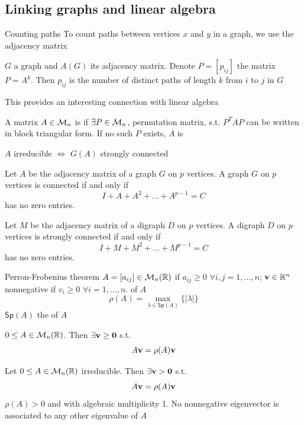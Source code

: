 \documentclass[aspectratio=43]{beamer}
\begin{document}
\subsection{Linking graphs and linear algebra}

\begin{frame}{Counting paths}
	To count paths between vertices $x$ and $y$ in a graph, we use the adjacency matrix
	\vfill
	\begin{theorem}
		$G$ a graph and $A(G)$ its adjacency matrix. Denote $P=[p_{ij}]$ the matrix $P=A^k$. Then $p_{ij}$ is the number of distinct paths of length $k$ from $i$ to $j$ in $G$
	\end{theorem}
	\vfill
	This provides an interesting connection with linear algebra
	\begin{definition}
		A matrix $A\in\mathcal{M}_n$ is  if $\exists P\in\mathcal{M}_n$, permutation matrix, s.t. $P^TAP$ can be written in block triangular form. If no such $P$ exists, $A$ is 
	\end{definition}
	\vfill
	\begin{theorem}
		$A$ irreducible $\iff$ $G(A)$ strongly connected
	\end{theorem}
\end{frame}

\begin{frame}
	\begin{theorem}
		Let $A$ be the adjacency matrix of a graph $G$ on $p$ vertices. 
		A graph $G$ on $p$ vertices is connected if and only if $$I+A+A^2+\dots+A^{p-1}=C$$
		has no zero entries.
	\end{theorem}
	\begin{theorem}
		Let $M$ be the adjacency matrix of a digraph $D$ on $p$ vertices. 
		A digraph $D$ on $p$ vertices is strongly connected if and only if $$I+M+M^2+\dots+M^{p-1}=C$$
		has no zero entries.
	\end{theorem}
\end{frame}


\begin{frame}{Perron-Frobenius theorem}
\vfill
$A=[a_{ij}]\in\mathcal{M}_n(\mathbb{R})$  if $a_{ij}\geq 0$ $\forall i,j=1,\ldots,n$; $\mathbf{v}\in\mathbb{R}^n$ nonnegative if $v_i\geq 0$ $\forall i=1,\ldots,n$.   of $A$
\[
\rho(A) = \max_{\lambda\in\mathsf{Sp}(A)}\{|\lambda|\}
\]
$\mathsf{Sp}(A)$ the  of $A$
\vfill
\begin{theorem}
$0\leq A\in\mathcal{M}_n(\mathbb{R})$. Then $\exists\bv\geq\b0$ s.t. 
\[
	A\mathbf{v}=\rho(A)\mathbf{v}
\]
\end{theorem}
\vfill

\begin{theorem}
	\label{th:PF}
	Let $0\leq A\in \mathcal{M}_n(\mathbb{R})$ irreducible. Then $\exists\bv>\b0$ s.t.
	\[
		A\mathbf{v}=\rho(A)\mathbf{v}
	\]
	$\rho(A)>0$ and with algebraic multiplicity 1.
	No nonnegative eigenvector is associated to any other eigenvalue of $A$
\end{theorem}
\end{frame}
\end{document}
